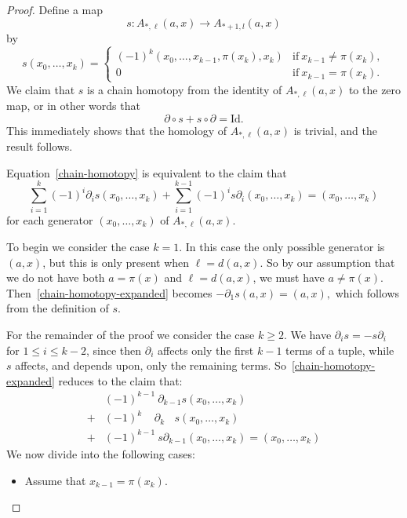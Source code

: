\documentclass[a4paper, 11 pt, oneside, reqno]{amsart}
\numberwithin{lemma}{section}
\theoremstyle{definition}
\begin{document}
\begin{proof}
    Define a map
    \[
    	s\colon A_{\ast,\ell}(a,x)
            \longrightarrow A_{\ast+1,l}(a,x)
    \]
    by
    \[
    	s(x_0,\ldots,x_k) 
    	=
    	\begin{cases}
    		(-1)^k(x_0,\ldots,x_{k-1},\pi(x_k),x_k)
    		& \mathrm{if}\ x_{k-1}\neq\pi(x_k),
    		\\
    		0
    		&
    		\mathrm{if}\ x_{k-1}=\pi(x_k).
    	\end{cases}
    \]
    We claim that $s$ is a chain homotopy from the identity
    of $A_{\ast,\ell}(a,x)$ to the zero map,
    or in other words that
    \begin{equation}\label{chain-homotopy}
        \partial\circ s + s\circ\partial=\mathrm{Id}.
    \end{equation}
    This immediately shows that the homology 
    of $A_{\ast,\ell}(a,x)$ is trivial, and the result
    follows.
    
    Equation~\eqref{chain-homotopy} is equivalent to the claim
    that 
    \begin{equation}\label{chain-homotopy-expanded}
    	\sum_{i=1}^k (-1)^i \partial_i s(x_0,\ldots,x_k)
    	+ \sum_{i=1}^{k-1}(-1)^i s\partial_i(x_0,\ldots,x_k)
    	=(x_0,\ldots,x_k)
    \end{equation}
    for each generator $(x_0,\ldots,x_k)$ of $A_{\ast,\ell}(a,x)$.

    To begin we consider the case $k=1$.
    In this case  the only possible generator is $(a,x)$, 
    but this is only present when $\ell = d(a,x)$.
    So by our assumption that we do not have both
    $a=\pi(x)$ and $\ell = d(a,x)$, we must have $a\neq\pi(x)$.
    Then~\eqref{chain-homotopy-expanded} becomes
    $
        -\partial_1 s(a,x)
        =
        (a,x),
    $ 
    which follows from the definition of $s$. 

    For the remainder of the proof we consider the case $k\geq 2$.
    We have $\partial_i s = -s\partial_i$ for $1\leq i\leq k-2$,
    since then $\partial_i$ affects only the first $k-1$ terms
    of a tuple, while $s$ affects, and depends upon, only the 
    remaining terms.
    So~\eqref{chain-homotopy-expanded} reduces to the claim
    that:
    \begin{equation}\label{chain-homotopy-simplified}
        \begin{split}
    	&(-1)^{k-1}\ \partial_{k-1}s(x_0,\ldots,x_k)
            \\
    	+
    	&(-1)^{k\phantom{-1}}\ \partial_{k\phantom{-1}} s(x_0,\ldots,x_k)
            \\
    	+&(-1)^{k-1}\ s\partial_{k-1}(x_0,\ldots,x_k)
            =
            (x_0,\ldots,x_k)
        \end{split}
    \end{equation}
    We now divide into the following cases:
    \begin{itemize}
        \item
        Assume that $x_{k-1}=\pi(x_k)$.
        

\end{itemize}
\end{proof}
\end{document}
